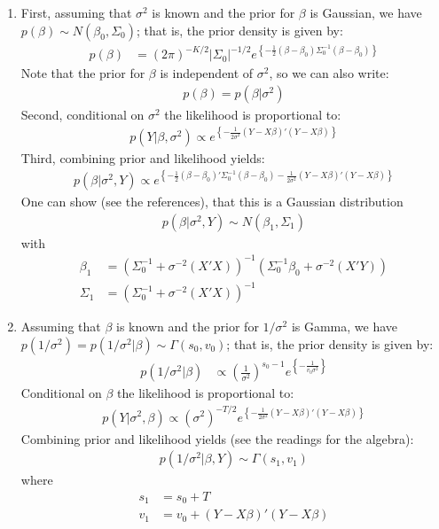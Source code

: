 \begin{enumerate}
\item First, assuming that \(\sigma^2\) is known and the prior for \(\beta \) is Gaussian,
we have \(p(\beta) \sim N(\beta_0,\Sigma_0)\);
that is, the prior density is given by:
\begin{align*} 
p(\beta) &= {(2\pi)}^{-K/2} |\Sigma_0|^{-1/2} e^{\left \{ -\frac{1}{2} (\beta - \beta_0) \Sigma_0^{-1} (\beta - \beta_0) \right \}}
\end{align*}
Note that the prior for \(\beta \) is independent of \(\sigma^2\),
so we can also write:
\begin{align*}
p(\beta) = p(\beta|\sigma^2)
\end{align*}
Second, conditional on \(\sigma^2\) the likelihood is proportional to:
\begin{align*}
p(Y|\beta,\sigma^2) \propto e^{\left \{-\frac{1}{2\sigma^2} (Y-X\beta)'(Y-X\beta)\right \}}
\end{align*}
Third, combining prior and likelihood yields:
\begin{align*}
p(\beta|\sigma^2,Y) \propto e^{\left \{ -\frac{1}{2} (\beta-\beta_0)' \Sigma_0^{-1} (\beta-\beta_0) - \frac{1}{2\sigma^2} (Y-X\beta)'(Y-X\beta) \right \}}
\end{align*}
One can show (see the references), that this is a Gaussian distribution
\begin{align*}
p(\beta|\sigma^2,Y) \sim N(\beta_1,\Sigma_1)
\end{align*}
with
\begin{align*}
\beta_1 &= \left( \Sigma_0^{-1} + \sigma^{-2} (X'X) \right)^{-1} \left( \Sigma_0^{-1} \beta_0 + \sigma^{-2} (X'Y) \right)
\\
\Sigma_1 &= \left( \Sigma_0^{-1} + \sigma^{-2} (X'X) \right)^{-1}
\end{align*}

\item Assuming that \(\beta \) is known and the prior for \(1/\sigma^2\) is Gamma,
we have \(p(1/\sigma^2) = p(1/\sigma^2|\beta) \sim \Gamma(s_0,v_0)\);
that is, the prior density is given by:
\begin{align*}
	p(1/\sigma^2|\beta) & \propto {\left(\frac{1}{\sigma^2} \right)}^{s_0-1} e^{\left \{ -\frac{1}{v_0\sigma^2} \right \}}
\end{align*}
Conditional on \(\beta \) the likelihood is proportional to:
\begin{align*}
p(Y|\sigma^2,\beta) \propto {(\sigma^2)}^{-T/2} e^{\left \{-\frac{1}{2\sigma^2} (Y-X\beta)'(Y-X\beta)\right \}}
\end{align*}
Combining prior and likelihood yields (see the readings for the algebra):
\begin{align*}
p(1/\sigma^2 | \beta, Y) \sim \Gamma(s_1,v_1)
\end{align*}
where
\begin{align*}
s_1 &= s_0 + T
\\
v_1 &= v_0 + (Y-X\beta)'(Y-X\beta)
\end{align*}


\end{enumerate}
